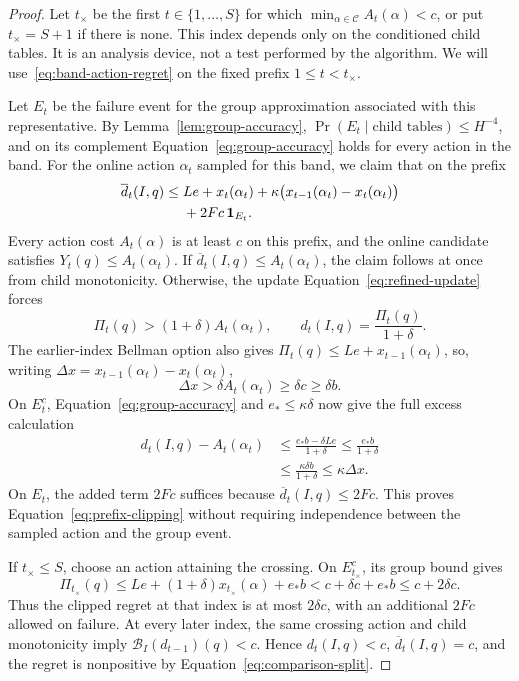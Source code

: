 \begin{proof}
Let $t_\times$ be the first $t\in\{1,\ldots,S\}$ for which
$\min_{\alpha\in\mathcal C}A_t(\alpha)<c$, or put $t_\times=S+1$
if there is none. This index depends only on the conditioned child tables.
It is an analysis device, not a test performed by the algorithm.
We will use~\eqref{eq:band-action-regret} on the fixed prefix
$1\le t<t_\times$.

Let $E_t$ be the failure event for the group approximation associated
with this representative. By Lemma~\ref{lem:group-accuracy},
$\Pr(E_t\mid\text{child tables})\le H^{-4}$, and on its complement
Equation~\ref{eq:group-accuracy} holds for every action in the band.
For the online action $\alpha_t$ sampled for this band, we claim that
on the prefix
\begin{equation}\label{eq:prefix-clipping}
\begin{split}
 \overline d_t(I,q)
 \le {}&Le+x_t(\alpha_t)
       +\kappa\bigl(x_{t-1}(\alpha_t)-x_t(\alpha_t)\bigr)\\
       &+2Fc\,\boldsymbol 1_{E_t}.
\end{split}
\end{equation}
Every action cost $A_t(\alpha)$ is at least $c$ on this prefix, and the
online candidate satisfies $Y_t(q)\le A_t(\alpha_t)$.
If $\overline d_t(I,q)\le A_t(\alpha_t)$, the claim follows at once
from child monotonicity. Otherwise, the update
Equation~\ref{eq:refined-update} forces
\[
 \Pi_t(q)>(1+\delta)A_t(\alpha_t),
 \qquad d_t(I,q)=\frac{\Pi_t(q)}{1+\delta}.
\]
The earlier-index Bellman option also gives
$\Pi_t(q)\le Le+x_{t-1}(\alpha_t)$, so, writing
$\Delta x=x_{t-1}(\alpha_t)-x_t(\alpha_t)$,
\[
 \Delta x>\delta A_t(\alpha_t)\ge\delta c\ge\delta b.
\]
On $E_t^c$, Equation~\ref{eq:group-accuracy} and $e_*\le\kappa\delta$
now give the full excess calculation
\[
 \begin{split}
 d_t(I,q)-A_t(\alpha_t)
 &\le\frac{e_*b-\delta Le}{1+\delta}
 \le\frac{e_*b}{1+\delta}\\
 &\le\frac{\kappa\delta b}{1+\delta}
 \le\kappa\Delta x.
 \end{split}
\]
On $E_t$, the added term $2Fc$ suffices because
$\overline d_t(I,q)\le2Fc$. This proves
Equation~\ref{eq:prefix-clipping} without requiring independence
between the sampled action and the group event.

If $t_\times\le S$, choose an action attaining the crossing.
On $E_{t_\times}^c$, its group bound gives
\[
 \Pi_{t_\times}(q)
 \le Le+(1+\delta)x_{t_\times}(\alpha)+e_*b
 <c+\delta c+e_*b\le c+2\delta c.
\]
Thus the clipped regret at that index is at most $2\delta c$,
with an additional $2Fc$ allowed on failure. At every later index,
the same crossing action and child monotonicity imply
$\mathcal B_I(d_{t-1})(q)<c$. Hence $d_t(I,q)<c$,
$\overline d_t(I,q)=c$, and the regret is nonpositive by
Equation~\ref{eq:comparison-split}.


\end{proof}
